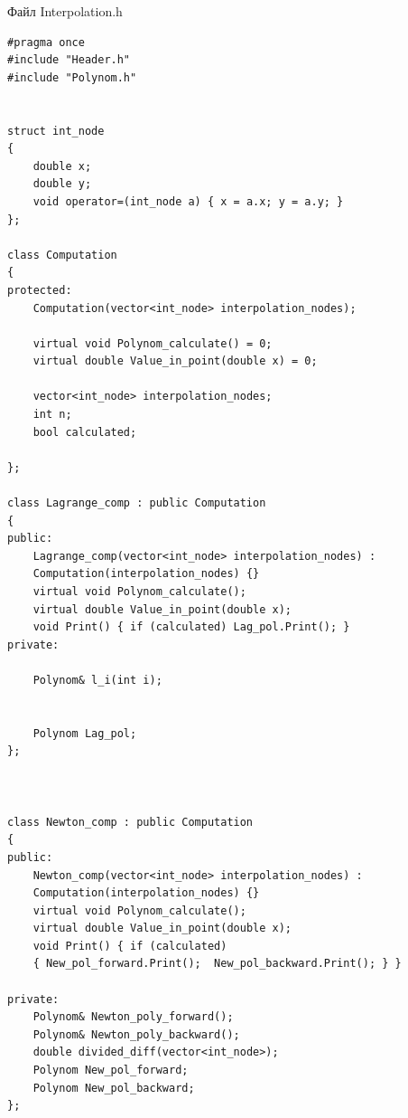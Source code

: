 \documentclass[14pt,a4paper,titlepage]{extarticle}
\begin{document}
Файл Interpolation.h
\begin{verbatim}
#pragma once
#include "Header.h"
#include "Polynom.h"


struct int_node
{
	double x;
	double y;
	void operator=(int_node a) { x = a.x; y = a.y; }
};

class Computation
{
protected:
	Computation(vector<int_node> interpolation_nodes);

	virtual void Polynom_calculate() = 0;
	virtual double Value_in_point(double x) = 0;

	vector<int_node> interpolation_nodes;
	int n;
	bool calculated;

};

class Lagrange_comp : public Computation
{
public:
	Lagrange_comp(vector<int_node> interpolation_nodes) :
	Computation(interpolation_nodes) {}
	virtual void Polynom_calculate();
	virtual double Value_in_point(double x);
	void Print() { if (calculated) Lag_pol.Print(); }
private:

	Polynom& l_i(int i);


	Polynom Lag_pol;
};



class Newton_comp : public Computation
{
public:
	Newton_comp(vector<int_node> interpolation_nodes) :
	Computation(interpolation_nodes) {}
	virtual void Polynom_calculate();
	virtual double Value_in_point(double x);
	void Print() { if (calculated) 
	{ New_pol_forward.Print();  New_pol_backward.Print(); } }

private:
	Polynom& Newton_poly_forward();
	Polynom& Newton_poly_backward();
	double divided_diff(vector<int_node>);
	Polynom New_pol_forward;
	Polynom New_pol_backward;
};
\end{verbatim}
\end{document}
